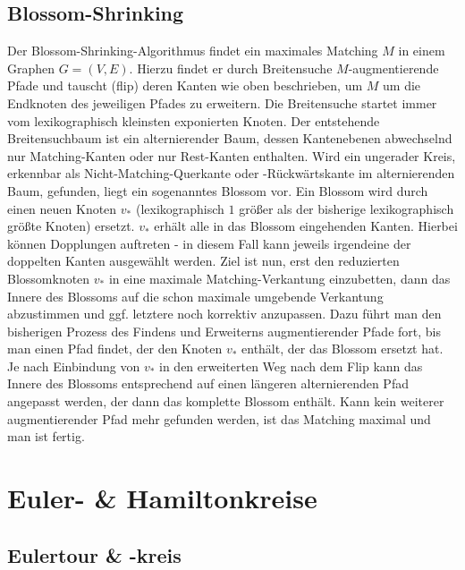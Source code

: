 \documentclass[10pt,a4paper,landscape]{article}
\begin{document}
\begin{multicols*}{2}
    \subsection{ Blossom-Shrinking }
    Der Blossom-Shrinking-Algorithmus findet ein maximales Matching $M$ in einem Graphen $G=(V,E)$. Hierzu findet er durch Breitensuche $M$-augmentierende Pfade 
    und tauscht (flip) deren Kanten wie oben beschrieben, um $M$ um die Endknoten des jeweiligen Pfades zu erweitern.
    \newline
    Die Breitensuche startet immer vom lexikographisch kleinsten exponierten Knoten. Der entstehende Breitensuchbaum ist ein alternierender Baum, 
    dessen Kantenebenen abwechselnd nur Matching-Kanten oder nur Rest-Kanten enthalten.
    \newline
    Wird ein ungerader Kreis, erkennbar als Nicht-Matching-Querkante oder -Rückwärtskante im alternierenden Baum, gefunden, liegt ein sogenanntes Blossom vor. Ein Blossom wird durch einen 
    neuen Knoten $v_*$ (lexikographisch $1$ größer als der bisherige lexikographisch größte Knoten) ersetzt. $v_*$ erhält alle in das Blossom eingehenden Kanten. 
    Hierbei können Dopplungen auftreten - in diesem Fall kann jeweils irgendeine der doppelten Kanten ausgewählt werden.
    \newline
    Ziel ist nun, erst den reduzierten Blossomknoten $v_*$ in eine maximale Matching-Verkantung einzubetten, dann das Innere des Blossoms auf die schon maximale
    umgebende Verkantung abzustimmen und ggf. letztere noch korrektiv anzupassen. Dazu führt man den bisherigen Prozess des Findens und Erweiterns augmentierender 
    Pfade fort, bis man einen Pfad findet, der den Knoten $v_*$ enthält, der das Blossom ersetzt hat. Je nach Einbindung von $v_*$ in den erweiterten Weg nach 
    dem Flip kann das Innere des Blossoms entsprechend auf einen längeren alternierenden Pfad angepasst werden, der dann das komplette Blossom enthält.
    \newline
    Kann kein weiterer augmentierender Pfad mehr gefunden werden, ist das Matching maximal und man ist fertig.

\section{ Euler- \& Hamiltonkreise }
    \subsection{ Eulertour \& -kreis}


\end{multicols*}
\end{document}
